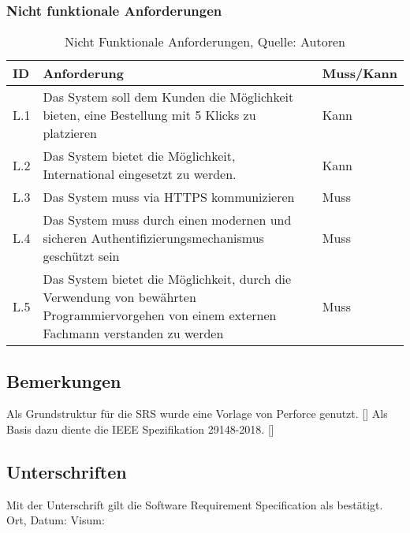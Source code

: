 \subsubsection{Nicht funktionale Anforderungen}
\begin{table}[H]
	\setlength\extrarowheight{2pt} %
	\begin{tabularx}{\textwidth}{|l|X|l|}
		\hline
		\textbf{ID} &  \textbf{Anforderung} & \textbf{Muss/Kann}  \\
        \hline
		L.1 & Das System soll dem Kunden die Möglichkeit bieten, eine Bestellung mit 5 Klicks zu platzieren  & Kann \\
		\hline
		L.2 & Das System bietet die Möglichkeit, International eingesetzt zu werden. & Kann \\
		\hline
		L.3 & Das System muss via HTTPS kommunizieren & Muss \\
		\hline
		L.4 & Das System muss durch einen modernen und sicheren Authentifizierungsmechanismus geschützt sein & Muss \\
		\hline
		L.5 & Das System bietet die Möglichkeit, durch die Verwendung von bewährten Programmiervorgehen von einem externen Fachmann verstanden zu werden & Muss \\
		\hline
	\end{tabularx}
	\caption{ \label{tbl: NichtFunktionaleAnforderungent}Nicht Funktionale Anforderungen, Quelle: Autoren}
\end{table}

\subsection{Bemerkungen}
Als Grundstruktur für die SRS wurde eine Vorlage von Perforce genutzt. [\cite{srsdocument}]
Als Basis dazu diente die IEEE Spezifikation 29148-2018. [\cite{ieeeSrs}]

\subsection{Unterschriften}
Mit der Unterschrift gilt die Software Requirement Specification als bestätigt.\\

Ort, Datum:	\underline{\hspace*{6cm}}	\hspace*{1cm} Visum:	\underline{\hspace*{4cm}}


\newpage
